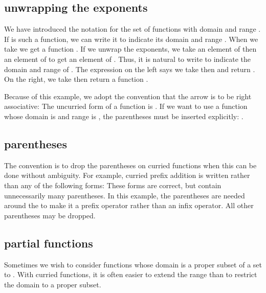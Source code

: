\documentclass[cup9a]{cupbook}
\begin{document}
\subsection{unwrapping the exponents}

We have introduced the notation  for the set of functions with domain  and range .    If  is such a function, we can write it
 to indicate its domain  and range .  When we take
 we get a function .  If we unwrap the exponents, we
take an element of  then an element of  to get an element of .
Thus, it is natural to write
to indicate the domain and range of .  The expression on the left
says we take  then  and return .  On the
right, we take  then return a function .

Because of this example, we adopt the convention that the arrow \mc{$\to$}
is to be right associative:
The uncurried form of a function  is .
If we want to use a function  whose domain is  and range is ,
the parentheses must be inserted explicitly: .

\subsection{parentheses}

The convention is to drop the parentheses on curried functions when this can be done without ambiguity.  For example, curried prefix addition is written
rather than any of the following forms:
These forms are correct, but contain unnecessarily many parentheses.
In this example, the parentheses are needed around the \mc{$(+)$} to make it
a prefix operator rather than an infix operator. All other parentheses may
be dropped.

\subsection{partial functions}

Sometimes we wish to consider functions whose domain is a proper subset of a set  to .  With curried functions, it is often easier to extend the range than to restrict the domain to a proper subset.
\end{document}
